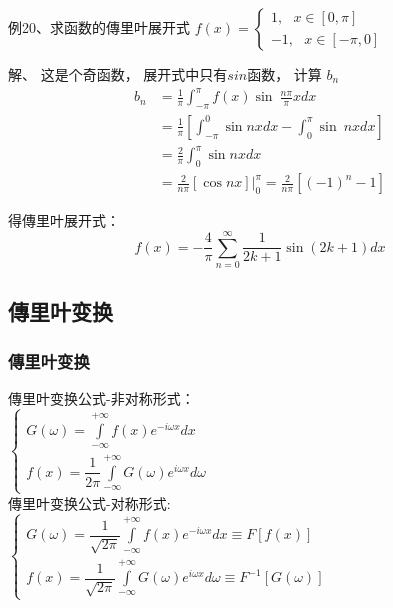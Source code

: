 \begin{frame}
	\begin{exampleblock} {例20、求函数的傳里叶展开式}
	$\displaystyle f(x)=\begin{cases}
		1 , ~~~ x \in [0, \pi] \\
		-1 ,~~~ x \in [-\pi, 0] \
	\end{cases}$ \\
	\end{exampleblock}
	\alert{解、} 这是个奇函数， 展开式中只有$sin$函数， 计算 $b_n$\\
	\begin{align*}
		b_n &=\frac{1}{\pi}  \int_{-\pi}^{\pi}  f(x) \sin~ \frac{n\pi}{\pi} x dx  \\	
		&=\frac{1}{\pi}  [ \int_{-\pi}^{0}  \sin n x dx - \int_{0}^{\pi}  \sin~nx dx] \\
		&=\frac{2}{\pi}  \int_{0}^{\pi}  \sin nx dx  \\
		&=\frac{2}{n\pi} [\cos nx] |_0 ^\pi =\frac{2}{n\pi} [ (-1) ^n -1]
	\end{align*}
\end{frame}

\begin{frame}
	得傳里叶展开式：
	\begin{equation*}
		f(x) = -\dfrac{4}{\pi} \sum_{n=0}^{\infty}  \dfrac{1}{2k+1} \sin(2k+1) dx  
	\end{equation*}       
\end{frame}

\subsection{傳里叶变换 }

\begin{frame}
\frametitle{傳里叶变换 }
	傳里叶变换公式-非对称形式：\\
	$\displaystyle \begin{cases}
		G(\omega) =\int\limits_{-\infty}^{+\infty}  f(x) e^{-i\omega x} dx \\
		f(x) =\dfrac{1}{2\pi} \int\limits_{-\infty}^{+\infty}  G(\omega) e^{i\omega x} d\omega
	\end{cases}$ \\ \vspace{0.3cm}
	傳里叶变换公式-对称形式:\\ 
	$\displaystyle \begin{cases}
		G(\omega) =\dfrac{1}{\sqrt{2\pi}} \int\limits_{-\infty}^{+\infty}  f(x) e^{-i\omega x} dx  \equiv F[f(x)]\\
		f(x) =\dfrac{1}{\sqrt{2\pi}}  \int\limits_{-\infty}^{+\infty}  G(\omega) e^{i\omega x} d\omega  \equiv F^{-1}[G(\omega)]
	\end{cases}$ \\	
\end{frame}


